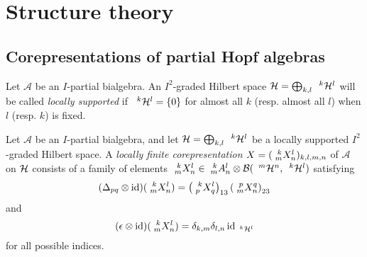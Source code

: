 \section{Structure theory}

\subsection{Corepresentations of partial Hopf algebras}


Let $\mathscr{A}$ be an $I$-partial bialgebra. An $I^2$-graded Hilbert space $\mathcal{H}=\bigoplus_{k,l} \Gru{\mathcal{H}}{k}{l}$ will be called \emph{locally supported} %
if $\Gru{\Hsp}{k}{l} = \{0\}$ for almost all $k$ (resp. almost all $l$) when $l$ (resp. $k$) is fixed.

\begin{Def} Let $\mathscr{A}$ be an $I$-partial bialgebra, and let $\mathcal{H}=\bigoplus_{k,l} \Gru{\mathcal{H}}{k}{l}$ be a locally supported $I^{2}$-graded Hilbert space.
A \emph{locally finite corepresentation}  $X=(\Gr{X}{k}{l}{m}{n})_{k,l,m,n}$ of $\mathscr{A}$ on $\Hsp$ consists of a family of elements 
  $\Gr{X}{k}{l}{m}{n} \in \Gr{A}{k}{l}{m}{n} \otimes
  \mathcal{B}(\Gru{\mathcal{H}}{m}{n},\Gru{\mathcal{H}}{k}{l})$
  satisfying
  \begin{align} \label{eq:rep-delta}
    (\Delta_{pq} \otimes \id)(\Gr{X}{k}{l}{m}{n}) =
    \left(\Gr{X}{k}{l}{p}{q}\right)_{13}\left(\Gr{X}{p}{q}{m}{n}\right)_{23}
  \end{align}
and   \[(\epsilon \otimes
    \id)(\Gr{X}{k}{l}{m}{n})=\delta_{k,m}\delta_{l,n}\id_{\Gru{\mathcal{H}}{k}{l}}\] 
for all possible indices.
\end{Def} 

